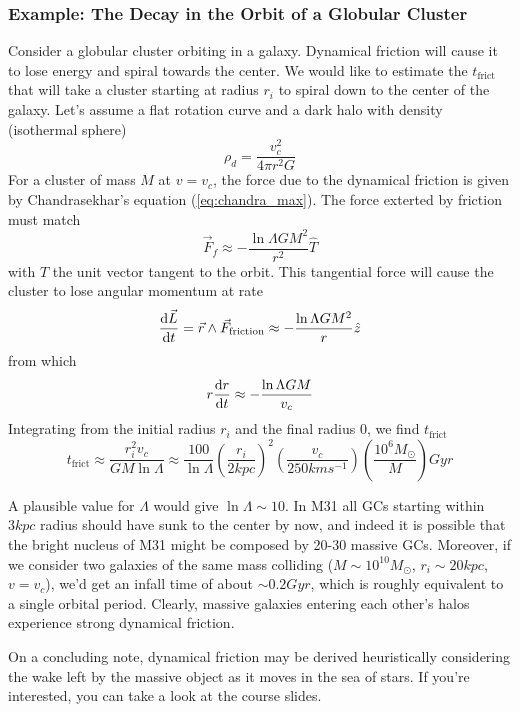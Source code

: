 \subsubsection*{Example: The Decay in the Orbit of a Globular Cluster}

Consider a globular cluster orbiting in a galaxy. Dynamical friction will cause it to lose energy and spiral towards the center. We would like to estimate the $t_{\text{frict}}$ that will take a cluster starting at radius $r_{i}$ to spiral down to the center of the galaxy. Let's assume a flat rotation curve and a dark halo with density (isothermal sphere)
\begin{equation*}
    \rho_{d} = \frac{v_{c}^{2}}{4\pi r^{2}G}
\end{equation*}
For a cluster of mass $M$ at $v = v_{c}$, the force due to the dynamical friction is given by Chandrasekhar's equation (\ref{eq:chandra_max}). The force exterted by friction must match
\begin{equation*}
    \vec{F}_{f} \approx -\frac{\ln\Lambda GM^{2}}{r^{2}}\hat{T}
\end{equation*}
with $\hat{T}$ the unit vector tangent to the orbit. This tangential force will cause the cluster to lose angular momentum at rate
\begin{equation*}
    \frac{\text{d}\vec{L}}{\text{d}t} = \vec{r}\wedge \vec{F}_{\text{friction}} \approx -\frac{\ln\Lambda GM^{2}}{r}\hat{z}
\end{equation*}
from which 
\begin{equation*}
    r\frac{\text{d}r}{\text{d}t}\approx -\frac{\ln\Lambda GM}{v_{c}}
\end{equation*}
Integrating from the initial radius $r_{i}$ and the final radius 0, we find $t_{\text{frict}}$
\begin{equation}
    t_{\text{frict}} \approx \frac{r_{i}^{2}v_{c}}{GM\ln\Lambda}\approx \frac{100}{\ln\Lambda}\left(\frac{r_{i}}{2\unit{kpc}}\right)^{2}\left(\frac{v_{c}}{250\unit{km}\unit{s}^{-1}}\right)\left(\frac{10^{6}M_{\odot}}{M}\right)\unit{Gyr}
    \label{eq:friction_ts}
\end{equation}
\par A plausible value for $\Lambda$ would give $\ln\Lambda \sim 10$. In M31 all GCs starting within $3\unit{kpc}$ radius should have sunk to the center by now, and indeed it is possible that the bright nucleus of M31 might be composed by 20-30 massive GCs. Moreover, if we consider two galaxies of the same mass colliding ($M\sim 10^{10}M_{\odot}$, $r_{i}\sim 20\unit{kpc}$, $v = v_{c}$), we'd get an infall time of about $\sim 0.2\unit{Gyr}$, which is roughly equivalent to a single orbital period. Clearly, massive galaxies entering each other's halos experience strong dynamical friction.
\par On a concluding note, dynamical friction may be derived heuristically considering the wake left by the massive object as it moves in the sea of stars. If you're interested, you can take a look at the course slides.

